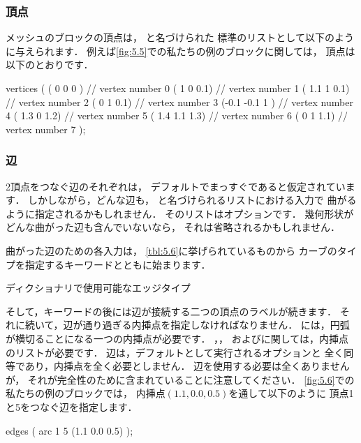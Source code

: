 \subsubsection{頂点}
\label{sssec:5.3.1.1}
メッシュのブロックの頂点は，
と名づけられた
標準のリストとして以下のように与えられます．
例えば\autoref{fig:5.5}での私たちの例のブロックに関しては，
頂点は以下のとおりです．
\begin{OFverbatim}[file]
vertices
(
    ( 0 0 0 ) // vertex number 0
    ( 1 0 0.1) // vertex number 1
    ( 1.1 1 0.1) // vertex number 2
    ( 0 1 0.1) // vertex number 3
    (-0.1 -0.1 1 ) // vertex number 4
    ( 1.3 0 1.2) // vertex number 5
    ( 1.4 1.1 1.3) // vertex number 6
    ( 0 1 1.1) // vertex number 7
);
\end{OFverbatim}

\subsubsection{辺}
\label{sssec:5.3.1.2}
2頂点をつなぐ辺のそれぞれは，
デフォルトでまっすぐであると仮定されています．
しかしながら，どんな辺も，
と名づけられるリストにおける入力で
曲がるように指定されるかもしれません．
そのリストはオプションです．
幾何形状がどんな曲がった辺も含んでいないなら，
それは省略されるかもしれません．

曲がった辺のための各入力は，
\autoref{tbl:5.6}に挙げられているものから
カーブのタイプを指定するキーワードとともに始まります．


\begin{table}[ht]
 
 \caption{ディクショナリで使用可能なエッジタイプ}
 \label{tbl:5.6}
\end{table}


そして，キーワードの後には辺が接続する二つの頂点のラベルが続きます．
それに続いて，辺が通り過ぎる内挿点を指定しなければなりません．
には，円弧が横切ることになる一つの内挿点が必要です．
，，
およびに関しては，内挿点のリストが必要です．
辺は，デフォルトとして実行されるオプションと
全く同等であり，内挿点を全く必要としません．
辺を使用する必要は全くありませんが，
それが完全性のために含まれていることに注意してください．
\autoref{fig:5.6}での私たちの例のブロックでは，
内挿点$(1.1, 0.0, 0.5)$を通して以下のように
頂点1と5をつなぐ辺を指定します．
\begin{OFverbatim}[file]
edges
(
    arc 1 5 (1.1 0.0 0.5)
);
\end{OFverbatim}

